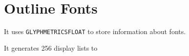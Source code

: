 \section{Outline Fonts}

It uses \verb|GLYPHMETRICSFLOAT| to store information about fonts.

It generates 256 display lists to 
